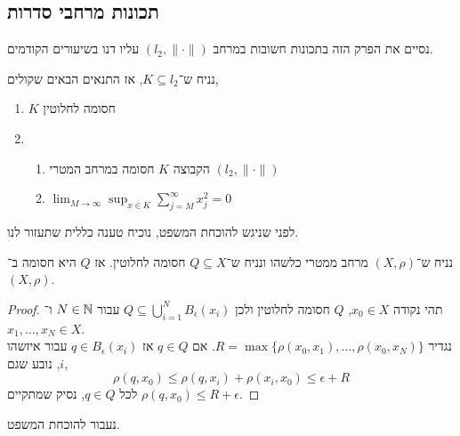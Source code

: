 \subsection{תכונות מרחבי סדרות}
נסיים את הפרק הזה בתכונות חשובות במרחב $(l_2, \lVert \cdot \rVert)$ עליו דנו בשיעורים הקודמים.
\begin{theorem}
	נניח ש־$K \subseteq l_2$, אז התנאים הבאים שקולים,
	\begin{enumerate}
		\item $K$ חסומה לחלוטין
		\item
			\begin{enumerate}
				\item הקבוצה $K$ חסומה במרחב המטרי $(l_2, \lVert \cdot \rVert)$
				\item $\lim_{M \to \infty} \sup_{x \in K} \sum_{j = M}^\infty x_j^2 = 0$
			\end{enumerate}
	\end{enumerate}
\end{theorem}
לפני שניגש להוכחת המשפט, נוכיח טענה כללית שתעזור לנו.
\begin{proposition}
	נניח ש־$(X, \rho)$ מרחב ממטרי כלשהו ונניח ש־$Q \subseteq X$ חסומה לחלוטין.
	אז $Q$ היא חסומה ב־$(X, \rho)$.
\end{proposition}
\begin{proof}
	תהי נקודה $x_0 \in X$, $Q$ חסומה לחלוטין ולכן $Q \subseteq \bigcup_{i = 1}^N B_{\epsilon}(x_i)$ עבור $N \in \mathbb{N}$ ו־$x_1, \ldots, x_N \in X$. \\
	נגדיר $R = \max\{ \rho(x_0, x_1), \ldots, \rho(x_0, x_N) \}$.
	אם $q \in Q$ אז $q \in B_{\epsilon}(x_i)$ עבור איזשהו $i$, נובע שגם,
	\[
		\rho(q, x_0)
		\le \rho(q, x_i) + \rho(x_i, x_0)
		\le \epsilon + R
	\] 
	לכל $q \in Q$, נסיק שמתקיים $\rho(q, x_0) \le R + \epsilon$.
\end{proof}
נעבור להוכחת המשפט.
